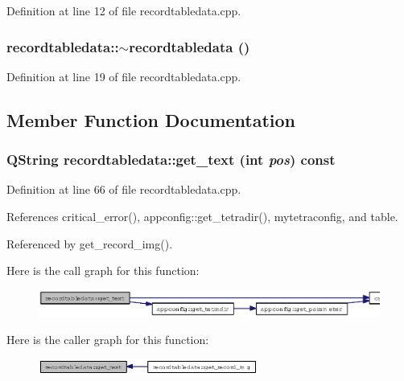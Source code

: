 Definition at line 12 of file recordtabledata.cpp.
\subsubsection{\setlength{\rightskip}{0pt plus 5cm}recordtabledata::$\sim$recordtabledata ()\hspace{0.3cm}{\tt  [virtual]}}\label{classrecordtabledata_0b64a48f7a000b2d0f0a0bd56e1ad415}




Definition at line 19 of file recordtabledata.cpp.

\subsection{Member Function Documentation}
\subsubsection{\setlength{\rightskip}{0pt plus 5cm}QString recordtabledata::get\_\-text (int {\em pos}) const}\label{classrecordtabledata_2d91c0e1c41a40d2692e47fc2ca1fb78}




Definition at line 66 of file recordtabledata.cpp.

References critical\_\-error(), appconfig::get\_\-tetradir(), mytetraconfig, and table.

Referenced by get\_\-record\_\-img().

Here is the call graph for this function:\begin{figure}[H]
\begin{center}
\leavevmode
\includegraphics[width=331pt]{classrecordtabledata_2d91c0e1c41a40d2692e47fc2ca1fb78_cgraph}
\end{center}
\end{figure}


Here is the caller graph for this function:\begin{figure}[H]
\begin{center}
\leavevmode
\includegraphics[width=204pt]{classrecordtabledata_2d91c0e1c41a40d2692e47fc2ca1fb78_icgraph}
\end{center}
\end{figure}

